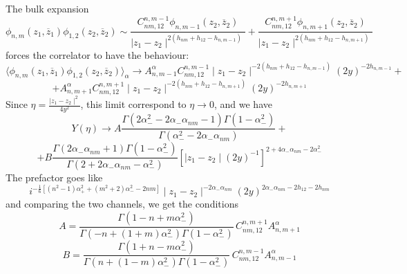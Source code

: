 \documentclass[a4paper,12pt]{report}
\begin{document}
The bulk expansion
\begin{equation}
\phi _{n,m}\left(z_{1},\overline{z}_{1} \right)\phi _{1,2}\left(z_{2},\overline{z}_{2} \right)\sim
\frac{C_{nm,12}^{n,m-1}\phi _{n,m-1}\left(z_{2},\overline{z}_{2} \right)}{\mid z_{1}-z_{2}\mid
^{2\left(h_{nm}+h_{12}-h_{n,m-1} \right)}}+\frac{C_{nm,12}^{n,m+1}\phi _{n,m+1}\left(z_{2},\overline{z}_{2}
\right)}{\mid z_{1}-z_{2}\mid ^{2\left(h_{nm}+h_{12}-h_{n,m+1} \right)}}
\end{equation}
forces the correlator to have the behaviour:
\begin{displaymath}
\langle \phi _{n,m}\left(z_{1},\overline{z}_{1} \right)\phi _{1,2}\left(z_{2},\overline{z}_{2} \right)\rangle
_{\alpha}\rightarrow A_{n,m-1}^{\alpha}C_{nm,12}^{n,m-1}\mid z_{1}-z_{2}\mid ^{-2\left(h_{nm}+h_{12}-h_{n,m-1}
\right)} \left(2y\right)^{-2h_{n,m-1}}+
\end{displaymath}
\begin{equation}
+A_{n,m+1}^{\alpha}C_{nm,12}^{n,m+1}\mid z_{1}-z_{2}\mid ^{-2\left(h_{nm}+h_{12}-h_{n,m+1} \right)}
\left(2y\right)^{-2h_{n,m+1}}
\end{equation}
Since $\eta =\frac{\mid z_{1}-z_{2}\mid ^{2}}{4y^{2}}$, this limit correspond to $\eta\rightarrow 0$, and we have
\begin{equation}
Y\left(\eta  \right)\rightarrow A\frac{\Gamma\left(2\alpha _{-}^{2}-2\alpha _{-}\alpha _{nm}-1\right) \Gamma
\left(1-\alpha _{-}^{2}\right)}{\Gamma \left(\alpha _{-}^{2}-2\alpha _{-}\alpha _{nm}\right)}+
\end{equation}
\begin{displaymath}
+B\frac{\Gamma \left(2\alpha _{-}\alpha _{nm}+1 \right)\Gamma \left(1-\alpha
_{-}^{2}\right)}{\Gamma\left(2+2\alpha _{-}\alpha _{nm}-\alpha _{-}^{2}\right) }\left[\mid z_{1}-z_{2}\mid
\left(2y \right)^{-1} \right]^{2+4\alpha _{-}\alpha _{nm}-2\alpha _{-}^{2}}
\end{displaymath}
The prefactor goes like
\begin{equation}
i^{-\frac{1}{6}\left[\left(n^{2}-1 \right)\alpha _{+}^{2}+\left(m^{2}+2 \right)\alpha _{-}^{2}-2nm \right]}\mid
z_{1}-z_{2}\mid ^{-2\alpha _{-}\alpha _{nm}}\left(2y \right)^{2\alpha_{-}\alpha _{nm}-2h_{12}-2h_{nm} }
\end{equation}
and comparing the two channels, we get the conditions
\begin{equation}\label{A}
A=\frac{\Gamma \left(1-n+m\alpha _{-}^{2} \right)}{\Gamma \left(-n+(1+m)\alpha _{-}^{2} \right)\Gamma
\left(1-\alpha _{-}^{2} \right)}\,C_{nm,12}^{n,m+1}A_{n,m+1}^{\alpha}
\end{equation}
\begin{equation}\label{B}
B=\frac{\Gamma \left(1+n-m\alpha _{-}^{2} \right)}{\Gamma \left(n+(1-m)\alpha _{-}^{2} \right)\Gamma
\left(1-\alpha _{-}^{2} \right)}\,C_{nm,12}^{n,m-1}A_{n,m-1}^{\alpha}
\end{equation}
\end{document}
